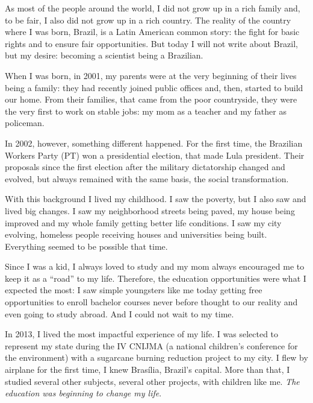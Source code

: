 
As most of the people around the world, I did not grow up in a rich family and, to be fair, I also did not grow up in a rich country. The reality of the country where I was born, Brazil, is a Latin American common story: the fight for basic rights and to ensure fair opportunities. But today I will not write about Brazil, but my desire: becoming a scientist being a Brazilian.

When I was born, in 2001, my parents were at the very beginning of their lives being a family: they had recently joined public offices and, then, started to build our home. From their families, that came from the poor countryside, they were the very first to work on stable jobs: my mom as a teacher and my father as policeman.

In 2002, however, something different happened. For the first time, the Brazilian Workers Party (PT) won a presidential election, that made Lula president. Their proposals since the first election after the military dictatorship changed and evolved, but always remained with the same basis, the social transformation.

With this background I lived my childhood. I saw the poverty, but I also saw and lived big changes. I saw my neighborhood streets being paved, my house being improved and my whole family getting better life conditions. I saw my city evolving, homeless people receiving houses and universities being built. Everything seemed to be possible that time.

Since I was a kid, I always loved to study and my mom always encouraged me to keep it as a ``road'' to my life. Therefore, the education opportunities were what I expected the most: I saw simple youngsters like me today getting free opportunities to enroll bachelor courses never before thought to our reality and even going to study abroad. And I could not wait to my time.

In 2013, I lived the most impactful experience of my life. I was selected to represent my state during the IV CNIJMA (a national children's conference for the environment) with a sugarcane burning reduction project to my city. I flew by airplane for the first time, I knew Bras\'ilia, Brazil's capital. More than that, I studied several other subjects, several other projects, with children like me. \emph{The education was beginning to change my life}.

